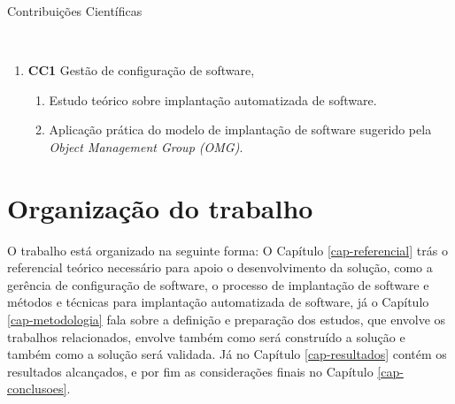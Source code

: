 \begin{description}
  \item [Contribuições Científicas]\
\end{description}
    \begin{enumerate}
      \item \textbf{CC1} Gestão de configuração de software,
        \begin{enumerate}
          \item Estudo teórico sobre implantação automatizada de software.
          \item Aplicação prática do modelo de implantação de software sugerido
pela \textit{Object Management Group (OMG)}.
        \end{enumerate}
    \end{enumerate}


\section{Organização do trabalho}
\label{sec:organizacao}

O trabalho está organizado na seguinte forma: O Capítulo \ref{cap-referencial}
trás o referencial teórico necessário para apoio o desenvolvimento da solução,
como a gerência de configuração de software, o processo de implantação de software
 e métodos e técnicas para implantação automatizada de software, já o Capítulo
\ref{cap-metodologia}
fala sobre a definição e preparação dos estudos, que envolve os trabalhos relacionados,
envolve também como será construído a solução e também como a solução será validada.
Já no Capítulo \ref{cap-resultados} contém os resultados alcançados, e por fim as
considerações finais no Capítulo \ref{cap-conclusoes}.

